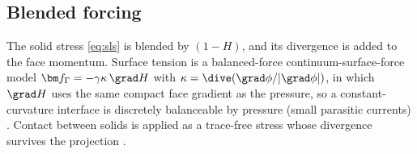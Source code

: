 \subsection{Blended forcing}
The solid stress \cref{eq:sls} is blended by $(1-H)$, and its divergence is added to the
face momentum. Surface tension is a balanced-force continuum-surface-force model
$\bm f_\Gamma=-\gamma\kappa\,\grad H$ with $\kappa=\dive(\grad\phi/|\grad\phi|)$, in
which $\grad H$ uses the same compact face gradient as the pressure, so a constant-%
curvature interface is discretely balanceable by pressure (small parasitic currents)
\cite{Brackbill1992}. Contact between solids is applied as a trace-free stress whose
divergence survives the projection \cite{Rycroft2020}.
